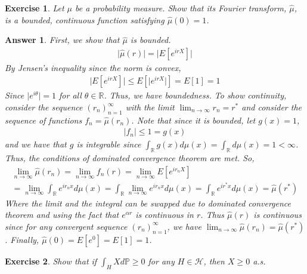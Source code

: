 \documentclass[12pt]{article}
\theoremstyle{colon}
\newtheorem{exercise}{Exercise}
\newtheorem*{answer}{Answer}
\begin{document}
\clearpage

\begin{exercise}
  Let $\mu$ be a probability measure. Show that its Fourier transform, $\hat{\mu}$, is a bounded, continuous function satisfying $\hat{\mu}(0)=1$.
\end{exercise}

\begin{answer}
  First, we show that $\hat{\mu}$ is bounded.
  \begin{gather*}
    \lvert \hat{\mu}(r) \rvert = \lvert E[e^{irX}] \rvert
  \end{gather*}
  By Jensen's inequality since the norm is convex,
  \begin{gather*}
    \lvert E[e^{irX}] \rvert \leq E[\lvert e^{irX} \rvert] = E[1] = 1
  \end{gather*}
  Since $\lvert e^{i \theta} \rvert = 1$ for all $\theta \in \mathbb{R}$. Thus, we have boundedness. To show continuity, consider the sequence $(r_n)_{n=1}^\infty$ with the limit $\lim_{n \rightarrow \infty} r_n = r^*$ and consider the sequence of functions $f_n = \hat{\mu}(r_n)$. Note that since it is bounded, let $g(x) = 1$,
  \begin{gather*}
    \lvert f_n \rvert \leq 1 = g(x)
  \end{gather*}
  and we have that $g$ is integrable since $\int_\mathbb{R} g(x) d\mu(x) = \int_\mathbb{R} d\mu(x) = 1 < \infty$. Thus, the conditions of dominated convergence theorem are met. So,
  \begin{gather*}
    \lim_{n \rightarrow \infty} \hat{\mu}(r_n) = \lim_{n \rightarrow \infty} f_n(r) = \lim_{n \rightarrow \infty} E[e^{ir_n X}] \\
    = \lim_{n \rightarrow \infty} \int_\mathbb{R} e^{ir_n x} d\mu(x) = \int_\mathbb{R} \lim_{n \rightarrow \infty} e^{ir_n x} d\mu(x) = \int_\mathbb{R} e^{ir^* x} d\mu(x) = \hat{\mu}(r^*)
  \end{gather*}
  Where the limit and the integral can be swapped due to dominated convergence theorem and using the fact that $e^{\alpha r}$ is continuous in $r$. Thus $\hat{\mu}(r)$ is continuous since for any convergent sequence $(r_n)_{n=1}^\infty$, we have $\lim_{n \rightarrow \infty} \hat{\mu}(r_n) = \hat{\mu}(r^*)$.
  Finally, $\hat{\mu}(0) = E[ e^{0}] = E[1] = 1$.
\end{answer}

\clearpage

\begin{exercise}
  Show that if $\displaystyle \int_H X d\mathbb{P} \geq 0$ for any $H \in \mathcal{H}$, then $X \geq 0$ a.s.
\end{exercise}
\end{document}
